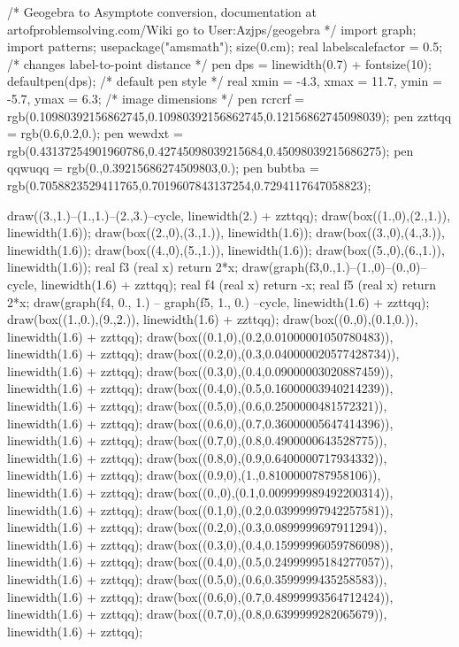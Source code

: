 /* Geogebra to Asymptote conversion, documentation at artofproblemsolving.com/Wiki go to User:Azjps/geogebra */
import graph; import patterns; usepackage("amsmath"); size(0.cm); 
real labelscalefactor = 0.5; /* changes label-to-point distance */
pen dps = linewidth(0.7) + fontsize(10); defaultpen(dps); /* default pen style */ real xmin = -4.3, xmax = 11.7, ymin = -5.7, ymax = 6.3;  /* image dimensions */
pen rcrcrf = rgb(0.10980392156862745,0.10980392156862745,0.12156862745098039); pen zzttqq = rgb(0.6,0.2,0.); pen wewdxt = rgb(0.43137254901960786,0.42745098039215684,0.45098039215686275); pen qqwuqq = rgb(0.,0.39215686274509803,0.); pen bubtba = rgb(0.7058823529411765,0.7019607843137254,0.7294117647058823); 

draw((3.,1.)--(1.,1.)--(2.,3.)--cycle, linewidth(2.) + zzttqq); 
draw(box((1.,0),(2.,1.)), linewidth(1.6)); 
draw(box((2.,0),(3.,1.)), linewidth(1.6)); 
draw(box((3.,0),(4.,3.)), linewidth(1.6)); 
draw(box((4.,0),(5.,1.)), linewidth(1.6)); 
draw(box((5.,0),(6.,1.)), linewidth(1.6)); 
real f3 (real x) {return 2*x;} 
draw(graph(f3,0.,1.)--(1.,0)--(0.,0)--cycle, linewidth(1.6) + zzttqq); 
real f4 (real x) { return -x; } real f5 (real x) { return 2*x; } 
draw(graph(f4, 0., 1.) -- graph(f5, 1., 0.) --cycle, linewidth(1.6) + zzttqq); 
draw(box((1.,0.),(9.,2.)), linewidth(1.6) + zzttqq); 
draw(box((0.,0),(0.1,0.)), linewidth(1.6) + zzttqq); 
draw(box((0.1,0),(0.2,0.01000001050780483)), linewidth(1.6) + zzttqq); 
draw(box((0.2,0),(0.3,0.040000020577428734)), linewidth(1.6) + zzttqq); 
draw(box((0.3,0),(0.4,0.09000003020887459)), linewidth(1.6) + zzttqq); 
draw(box((0.4,0),(0.5,0.16000003940214239)), linewidth(1.6) + zzttqq); 
draw(box((0.5,0),(0.6,0.2500000481572321)), linewidth(1.6) + zzttqq); 
draw(box((0.6,0),(0.7,0.36000005647414396)), linewidth(1.6) + zzttqq); 
draw(box((0.7,0),(0.8,0.4900000643528775)), linewidth(1.6) + zzttqq); 
draw(box((0.8,0),(0.9,0.6400000717934332)), linewidth(1.6) + zzttqq); 
draw(box((0.9,0),(1.,0.8100000787958106)), linewidth(1.6) + zzttqq); 
draw(box((0.,0),(0.1,0.009999989492200314)), linewidth(1.6) + zzttqq); 
draw(box((0.1,0),(0.2,0.03999997942257581)), linewidth(1.6) + zzttqq); 
draw(box((0.2,0),(0.3,0.0899999697911294)), linewidth(1.6) + zzttqq); 
draw(box((0.3,0),(0.4,0.15999996059786098)), linewidth(1.6) + zzttqq); 
draw(box((0.4,0),(0.5,0.24999995184277057)), linewidth(1.6) + zzttqq); 
draw(box((0.5,0),(0.6,0.3599999435258583)), linewidth(1.6) + zzttqq); 
draw(box((0.6,0),(0.7,0.48999993564712424)), linewidth(1.6) + zzttqq); 
draw(box((0.7,0),(0.8,0.6399999282065679)), linewidth(1.6) + zzttqq); 
